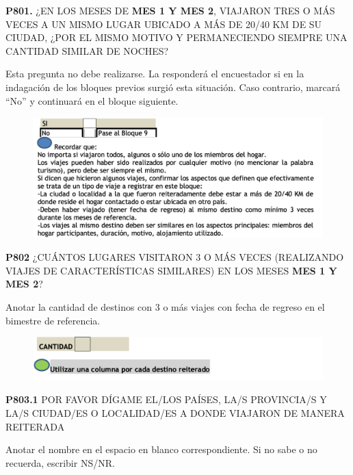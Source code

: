 \documentclass[
  openany]{book}
\begin{document}
\textbf{P801.} ¿EN LOS MESES DE \textbf{MES 1 Y MES 2}, VIAJARON TRES O MÁS VECES A UN MISMO LUGAR UBICADO A MÁS DE 20/40 KM DE SU CIUDAD, ¿POR EL MISMO MOTIVO Y PERMANECIENDO SIEMPRE UNA CANTIDAD SIMILAR DE NOCHES?

Esta pregunta no debe realizarse. La responderá el encuestador si en la indagación de los bloques previos surgió esta situación. Caso contrario, marcará ``No'' y continuará en el bloque siguiente.

\begin{figure}

{\centering \includegraphics[width=1\linewidth]{imagenes/figura6-253} 

}

\end{figure}

\textbf{P802} ¿CUÁNTOS LUGARES VISITARON 3 O MÁS VECES (REALIZANDO VIAJES DE CARACTERÍSTICAS SIMILARES) EN LOS MESES \textbf{MES 1 Y MES 2}?

Anotar la cantidad de destinos con 3 o más viajes con fecha de regreso en el bimestre de referencia.

\begin{figure}

{\centering \includegraphics[width=1\linewidth]{imagenes/figura6-254} 

}

\end{figure}

\textbf{P803.1} POR FAVOR DÍGAME EL/LOS PAÍSES, LA/S PROVINCIA/S Y LA/S CIUDAD/ES O LOCALIDAD/ES A DONDE VIAJARON DE MANERA REITERADA

Anotar el nombre en el espacio en blanco correspondiente. Si no sabe o no recuerda, escribir NS/NR.
\end{document}
